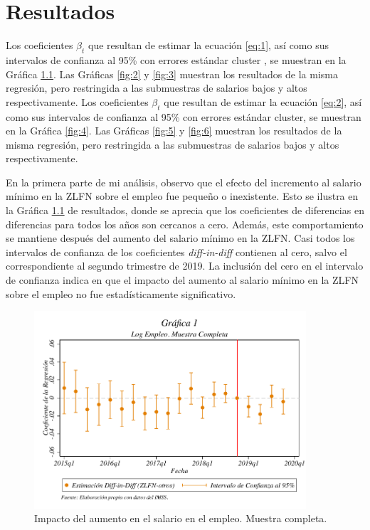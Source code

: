 \chapter{Resultados}
\label{ch:results}


\noindent Los coeficientes $\beta_t$ que resultan de estimar la ecuación \ref{eq:1}, así como sus intervalos de confianza al 95\% con errores estándar cluster , se muestran en la Gráfica \ref{fig:1}. Las Gráficas \ref{fig:2} y \ref{fig:3} muestran los resultados de la misma regresión, pero restringida a las submuestras de salarios bajos y altos respectivamente. Los coeficientes $\beta_t$ que resultan de estimar la ecuación \ref{eq:2}, así como sus intervalos de confianza al 95\% con errores estándar cluster, se muestran en la Gráfica \ref{fig:4}. Las Gráficas \ref{fig:5} y \ref{fig:6} muestran los resultados de la misma regresión, pero restringida a las submuestras de salarios bajos y altos respectivamente.

En la primera parte de mi análisis, observo que el efecto del incremento al salario mínimo en la ZLFN sobre el empleo fue pequeño o inexistente. Esto se ilustra en la Gráfica \ref{fig:1} de resultados, donde se aprecia que los coeficientes de diferencias en diferencias para todos los años son cercanos a cero. Además, este comportamiento se mantiene después del aumento del salario mínimo en la ZLFN. Casi todos los intervalos de confianza de los coeficientes \textit{diff-in-diff} contienen al cero, salvo el correspondiente al segundo trimestre de 2019. La inclusión del cero en el intervalo de confianza indica en que el impacto del aumento al salario mínimo en la ZLFN sobre el empleo no fue estadísticamente significativo.      

\begin{figure}[H]
\includegraphics[width=0.9\textwidth]{Figures/LogEmpleo_MuestraCompleta.pdf}
\caption{Impacto del aumento en el salario en el empleo. Muestra completa.}
\label{fig:1}
\end{figure}


